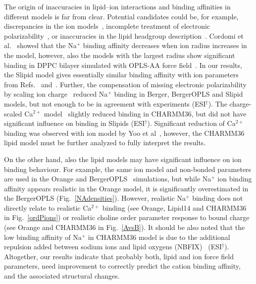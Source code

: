\documentclass[twoside,twocolumn,9pt]{article}
\begin{document}
The origin of inaccuracies in lipid--ion interactions and binding affinities in different models is far from clear.
Potential candidates could be, for example, discrepancies in the ion models~\cite{hess06,chen07,Reif13},
incomplete treatment of electronic polarizability~\cite{leontyev11}, or inaccuracies in the lipid headgroup 
description~\cite{botan15}. Cordomi et al.~\cite{cordomi09} showed that the Na$^+$ binding affinity decreases when ion radius increases
in the model, however, also the models with the largest radius show significant binding in DPPC bilayer simulated with
OPLS-AA force field~\cite{jorgensen96}. In our results, the Slipid model gives essentially similar binding affinity with 
ion parameters from Refs.~\cite{smith94} and~\cite{beglov94,roux96}. Further, the compensation of missing electronic 
polarizability by scaling ion charge~\cite{kohagen16,leontyev11} reduced Na$^+$ binding in Berger, 
BergerOPLS and Slipid models, but not enough to be in agreement with experiments (ESI$^\dag$). 
The charge-scaled Ca$^{2+}$ model~\cite{kohagen14} slightly reduced binding in CHARMM36, but did not have 
significant influence on binding in Slipids (ESI$^\dag$). Significant reduction of
Ca$^{2+}$ binding was observed with ion model by Yoo et al~\cite{yoo16}, however, the CHARMM36 lipid
model must be further analyzed to fully interpret the results.

On the other hand, also the lipid models may have significant influence on ion binding behaviour.
For example, the same ion model and non-bonded parameters are used in the Orange and BergerOPLS~\cite{tieleman06} 
simulations, but while Na$^+$ ion binding affinity appears realistic in the Orange model, it is significantly overestimated 
in the BergerOPLS (Fig.~\ref{NAdensities}). However, realistic Na$^+$ binding does not directly relate
to realistic Ca$^{2+}$ binding (see Orange, Lipid14 and CHARMM36 in Fig.~\ref{ordPions}) or realistic choline
order parameter response to bound charge (see Orange and CHARMM36 in Fig.~\ref{AvsB}).
It should be also noted that the low binding affinity of Na$^+$ in CHARMM36 model is due to 
the additional repulsion added between sodium ions and lipid oxygens (NBFIX)~\cite{venable13} (ESI$^\dag$).
Altogether, our results indicate that probably both, lipid and ion force field parameters, need improvement to 
correctly predict the cation binding affinity, and the associated structural changes.
\end{document}
